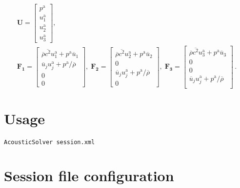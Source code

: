 \begin{gather}
\boldsymbol{U} = \left[
\begin{matrix}
    p^{\mathrm{a}} \\
    u^{\mathrm{a}}_1 \\
    u^{\mathrm{a}}_2 \\
    u^{\mathrm{a}}_3
\end{matrix}
\right] , \\
\boldsymbol{F_1} = \left[
\begin{matrix}
    \overline{\rho} \overline{c^2} u^{\mathrm{a}}_1 + p^{\mathrm{a}} \overline{u}_1  \\
    \overline{u}_j u^{\mathrm{a}}_j + p^{\mathrm{a}} / \overline{\rho}  \\
0 \\
0
\end{matrix}
\right]     , \;
\boldsymbol{F_2} = \left[
\begin{matrix}
    \overline{\rho} \overline{c^2} u^{\mathrm{a}}_2 + p^{\mathrm{a}} \overline{u}_2  \\
0 \\
    \overline{u}_j u^{\mathrm{a}}_j + p^{\mathrm{a}} / \overline{\rho}  \\
0
\end{matrix}
\right]    , \;
\boldsymbol{F_3} = \left[
\begin{matrix}
    \overline{\rho} \overline{c^2} u^{\mathrm{a}}_3 + p^{\mathrm{a}} \overline{u}_3 \\
0     \\
0     \\
    \overline{u}_j u^{\mathrm{a}}_j + p^{\mathrm{a}} / \overline{\rho}  \\
\end{matrix}
\right]
\,.
\end{gather}







\section{Usage}
\begin{lstlisting}[style=BashInputStyle]
AcousticSolver session.xml
\end{lstlisting}

\section{Session file configuration}

